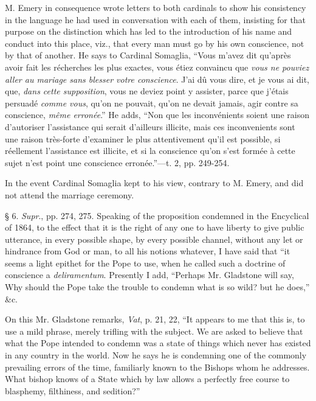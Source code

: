 M. Emery in consequence wrote letters to both cardinals to show his
consistency in the language he had used in conversation with each of
them, insisting for that purpose on the distinction which has led to the
introduction of his name and conduct into this place, viz., that every
man must go by his own conscience, not by that of another. He says to
Cardinal Somaglia, ``Vous m'avez dit qu'après avoir fait les
récherches les plus exactes, vous étiez convaincu que \emph{vous ne
pouviez aller au mariage sans blesser votre conscience}. J'ai dû
vous dire, et je vous ai dit, que, \emph{dans cette supposition}, vous
ne deviez point y assister, parce que j'étais persuadé \emph{comme vous},
qu'on ne pouvait, qu'on ne devait jamais, agir contre sa conscience, \emph{même
erronée}.'' He adds, ``Non que les inconvénients soient une
raison d'autoriser l'assistance qui serait d'ailleurs illicite, mais ces
inconvenients sont une raison très-forte d'examiner le plus
attentivement qu'il est possible, si réellement l'assistance est
illicite, et si la conscience qu'on s'est formée à cette sujet n'est
point une conscience erronée.''—t. 2, pp. 249-254.

In the event Cardinal Somaglia kept to his view, contrary to M.
Emery, and did not attend the marriage ceremony.

§ 6.
\emph{Supr}., pp. 274, 275. Speaking of the proposition condemned in the
Encyclical of 1864, to the effect that it is the right of any one to
have liberty to give public utterance, in every possible shape, by every
possible channel, without any let or hindrance from God or man, to all
his notions whatever, I have said that ``it seems a light epithet
for the Pope to use, when he called such a doctrine of conscience a \emph{deliramentum}.
Presently I add, ``Perhaps Mr. Gladstone will say, Why should the
Pope take the trouble to condemn what is so wild? but he does,''
\&c.

On this Mr. Gladstone remarks, \emph{Vat}, p. 21, 22, ``It
appears to me that this is, to use a mild phrase, merely trifling with
the subject. We are asked to believe that what the Pope intended to
condemn was a state of things which never has existed in any country in
the world. Now he says he is condemning one of the commonly prevailing
errors of the time, familiarly known to the Bishops whom he addresses.
What bishop knows of a State which by law allows a perfectly free course
to blasphemy, filthiness, and sedition?''

